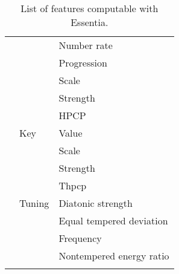 \begin{center}
\begin{longtable}{ p{} p{} p{} }
& & Number rate \\ \cmidrule(r){3-3}
& & Progression \\ \cmidrule(r){3-3}
& & Scale \\ \cmidrule(r){3-3}
& & Strength \\ \cmidrule(r){3-3}
& & HPCP \\ \cmidrule(r){2-3}
& Key & Value \\ \cmidrule(r){3-3}
& & Scale \\ \cmidrule(r){3-3}
& & Strength \\ \cmidrule(r){3-3}
& & Thpcp \\ \cmidrule(r){2-3}
& Tuning & Diatonic strength \\ \cmidrule(r){3-3}
& & Equal tempered deviation \\ \cmidrule(r){3-3}
& & Frequency \\ \cmidrule(r){3-3}
& & Nontempered energy ratio \\ \bottomrule

\caption[List of features computable with Essentia]{List of features computable with Essentia.}
\label{table:essentiaFeatures}
\end{longtable}
\end{center}